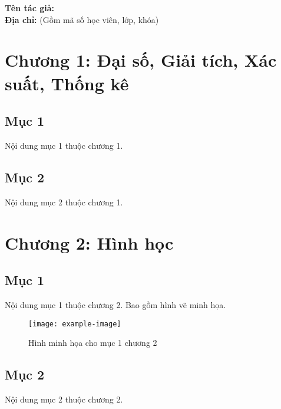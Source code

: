 \documentclass[a4paper]{book}
\begin{document}
\vspace{1cm}

\begin{flushleft}
    \large
    \textbf{Tên tác giả:} \\
    \textbf{Địa chỉ:} (Gồm mã số học viên, lớp, khóa)
\end{flushleft}

\vspace{1cm}

\chapter{Chương 1: Đại số, Giải tích, Xác suất, Thống kê}
\section{Mục 1}
Nội dung mục 1 thuộc chương 1.

\section{Mục 2}
Nội dung mục 2 thuộc chương 1.

\chapter{Chương 2: Hình học}
\section{Mục 1}
Nội dung mục 1 thuộc chương 2. Bao gồm hình vẽ minh họa.

\begin{figure}[h]
    \centering
    \texttt{[image: example-image]} %
    \caption{Hình minh họa cho mục 1 chương 2}
    \label{fig:example}
\end{figure}

\section{Mục 2}
Nội dung mục 2 thuộc chương 2.
\end{document}
